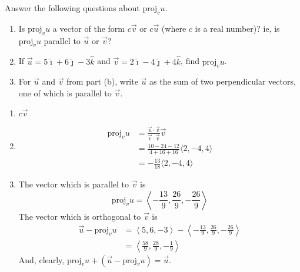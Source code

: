 \documentclass[]{ximera}
\begin{document}
\begin{problem}
Answer the following questions about $\text{proj}_v u$.
	\begin{enumerate}
	\item  Is $\text{proj}_v u$ a vector of the form $c \vec{v}$ or $c \vec{u}$ (where $c$ is a real number)?  
	ie, is $\text{proj}_v u$ parallel to $\vec{u}$ or $\vec{v}$?  
	
	\item  If $\vec{u} = 5 \hat{\imath} + 6 \hat{\jmath} - 3 \hat{k}$ and $\vec{v} = 2 \hat{\imath} - 4 \hat{\jmath} + 4 \hat{k}$, find $\text{proj}_v u$.
	
	\item  For $\vec{u}$ and $\vec{v}$ from part (b), write $\vec{u}$ as the sum of two perpendicular vectors, one of which is parallel to $\vec{v}$.  
	\end{enumerate}
	
	\begin{freeResponse}
	\begin{enumerate}
	\item  $\boxed{c \vec{v}}$
	
	\item  
		\begin{align*}
		\text{proj}_v u 
		&= \frac{\vec{u} \cdot \vec{v}}{\vec{v} \cdot \vec{v}} \vec{v}  \\
		&= \frac{10-24-12}{4+16+16} \langle 2,-4,4 \rangle  \\
		&= \boxed{- \frac{13}{18} \langle 2,-4,4 \rangle  }
		\end{align*}
	
	
	
	\item  
		
	The vector which is parallel to $\vec{v}$ is 
		\[
		\text{proj}_v u = \boxed{\left\langle - \frac{13}{9}, \frac{26}{9}, - \frac{26}{9} \right\rangle}
		\]
	The vector which is orthogonal to $\vec{v}$ is
		\begin{align*}
		\vec{u} - \text{proj}_v u
		&= \left\langle 5,6,-3 \right\rangle - \left\langle - \frac{13}{9}, \frac{26}{9}, - \frac{26}{9} \right\rangle  \\
		&= \boxed{\left\langle \frac{58}{9}, \frac{28}{9}, - \frac{1}{9} \right\rangle}
		\end{align*}
	And, clearly, $\text{proj}_v u + (\vec{u} - \text{proj}_v u) = \vec{u}$.  
	
	\end{enumerate}
	
	\end{freeResponse}

\end{problem}
\end{document}
